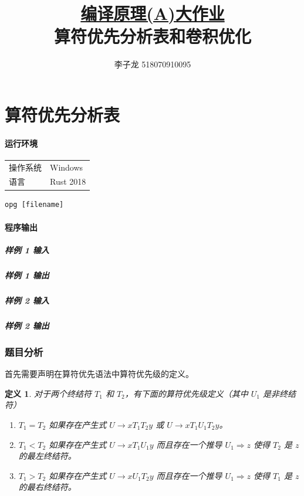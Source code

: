 \documentclass[UTF8]{ctexart}
\title{\normalsize\underline{编译原理(A)大作业}\\\Large 算符优先分析表和卷积优化}
\author{李子龙 518070910095}
\newtheorem{definition}{定义}
\begin{document}
    \maketitle 
    \tableofcontents
    \clearpage

\part{算符优先分析表}
\subsection*{运行环境}
\begin{tabular}{ll}
    操作系统 & Windows \\
    语言 & Rust 2018\cite{SteveKlabnik2019} \\
\end{tabular}
\vspace*{1em}
\begin{lstlisting}[frameround=fttt]
    opg [filename]
\end{lstlisting}
\subsection*{程序输出}
\subsubsection*{样例 1 输入}

\subsubsection*{样例 1 输出}

\subsubsection*{样例 2 输入}

\subsubsection*{样例 2 输出}


\section{题目分析}

首先需要声明在算符优先语法中算符优先级的定义\cite{Floyd1963}。
\begin{definition}\label{def:op}
    对于两个终结符 $T_1$ 和 $T_2$，有下面的算符优先级定义（其中 $U_1$ 是非终结符）
    \begin{enumerate}
        \item $T_1=T_2$ 如果存在产生式 $U\rightarrow xT_1T_2y$ 或 $U\rightarrow xT_1 U_1 T_2 y$。
        \item $T_1<T_2$ 如果存在产生式 $U\rightarrow xT_1U_1y$ 而且存在一个推导 $U_1\Rightarrow z$ 使得 $T_2$ 是 $z$ 的最左终结符。
        \item $T_1>T_2$ 如果存在产生式 $U\rightarrow xU_1T_2y$ 而且存在一个推导 $U_1\Rightarrow z$ 使得 $T_1$ 是 $z$ 的最右终结符。
    \end{enumerate}
\end{definition}
\end{document}
